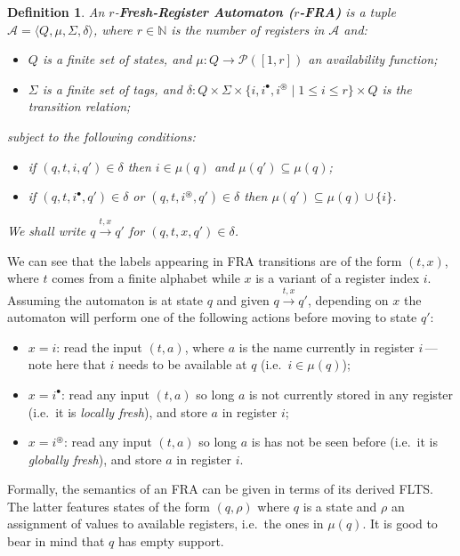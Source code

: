 \documentclass[10pt,a4paper]{article}
\newtheorem{definition}[theorem]{Definition}
\theoremstyle{definition}
\theoremstyle{remark}
\newcommand\boldemph[1]{\emph{\textbf{#1}}}
\newcommand\Lfr[1]{#1^\bullet}
\newcommand\Gfr[1]{#1^\circledast}
\newcommand\Acal{\mathcal{A}}
\newcommand\Pcal{\mathcal{P}}
\begin{document}
\begin{definition}\label{def:FRAs}
  An $r$-\boldemph{Fresh-Register Automaton ($r$-FRA)} is a tuple $\Acal=\langle Q,\mu,\Sigma,\delta\rangle$, where $r\in\mathbb{N}$ is the number of \emph{registers} in $\Acal$ and:
  \begin{itemize}
  \item $Q$ is a finite set of \emph{states}, and $\mu:Q\to\Pcal([1,r])$ an \emph{availability function};
  \item $\Sigma$ is a finite set of {tags}, and
 $\delta:Q\times\Sigma\times\{i,\Lfr{i},\Gfr{i}\mid 1\leq i\leq r\}\times Q$ is the transition relation;
    \end{itemize}
    subject to the following conditions:
    \begin{itemize}
    \item if $(q,t,i,q')\in\delta$ then $i\in\mu(q)$ and $\mu(q')\subseteq\mu(q)$;
    \item
      if $(q,t,\Lfr i,q')\in\delta$ or $(q,t,\Gfr i,q')\in\delta$ then $\mu(q')\subseteq\mu(q)\cup\{i\}$.
    \end{itemize}
    We shall write $q\xrightarrow{t,x}q'$ for $(q,t,x,q')\in\delta$.
  \end{definition}

  We can see that the labels appearing in FRA transitions are of the form $(t,x)$, where $t$ comes from a finite alphabet while $x$ is a variant of a register index $i$.
Assuming the automaton is at state $q$ and given $q\xrightarrow{t,x}q'$, 
depending on $x$ the automaton will perform one of the following actions before moving to state $q'$:
  \begin{itemize}
  \item $x=i$: read the input $(t,a)$, where $a$ is the name currently in register $i$\,---\,note here that $i$ needs to be available at $q$ (i.e.\ $i\in\mu(q)$);
  \item $x=\Lfr{i}$: read any input $(t,a)$ so long $a$ is not currently stored in any register (i.e.\ it is \emph{locally fresh}), and store $a$ in register $i$;
  \item $x=\Gfr{i}$: read any input $(t,a)$ so long $a$ is has not be seen before (i.e.\ it is \emph{globally fresh}), and store $a$ in register $i$.
  \end{itemize}
Formally, the semantics of an FRA can be given in terms of its derived FLTS.
The latter features states of the form $(q,\rho)$ where $q$ is a state and $\rho$ an assignment of values to available registers, i.e.\ the ones in $\mu(q)$.
It is good to bear in mind that $q$ has empty support.
\end{document}
